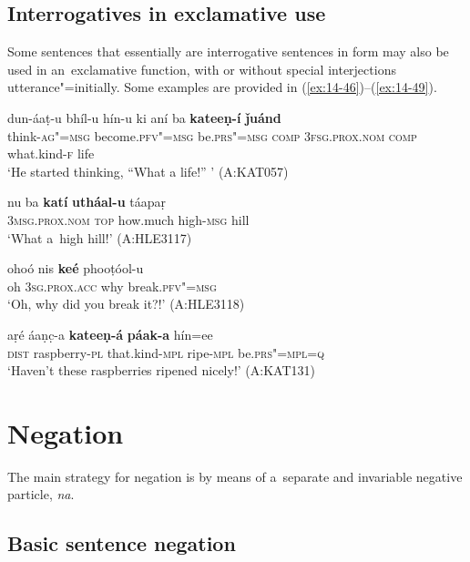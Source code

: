 \subsection{Interrogatives in exclamative use}
\label{subsec:14-2-4}

Some sentences that essentially are interrogative sentences in form may also be used in an~exclamative function, with or without special interjections utterance"=initially. Some examples are provided in (\ref{ex:14-46})--(\ref{ex:14-49}). 
\begin{exe}
\ex
\label{ex:14-46}
\gll dun-áaṭ-u bhíl-u hín-u ki  aní ba \textbf{kateeṇ-í} \textbf{ǰuánd} \\
think-\textsc{ag"=msg} become.\textsc{pfv"=msg} be.\textsc{prs"=msg} \textsc{comp}  \textsc{3fsg.prox.nom} \textsc{comp} what.kind-\textsc{f} life  \\
\glt `He started thinking, ``What a life!'' ' (A:KAT057)

\ex
\label{ex:14-47}
\gll nu ba \textbf{katí} \textbf{utháal-u} táapaṛ \\
\textsc{3msg.prox.nom} \textsc{top} how.much high-\textsc{msg} hill  \\
\glt `What a~high hill!' (A:HLE3117)

\ex
\label{ex:14-48}
\gll ohoó nis \textbf{keé} phooṭóol-u \\
oh \textsc{3sg.prox.acc} why break.\textsc{pfv"=msg} \\
\glt `Oh, why did you break it?!' (A:HLE3118)

\ex
\label{ex:14-49}
\gll aṛé áaṇc̣-a \textbf{kateeṇ-á} \textbf{páak-a} hín=ee \\
\textsc{dist} raspberry-\textsc{pl} that.kind-\textsc{mpl} ripe-\textsc{mpl} be.\textsc{prs"=mpl=q} \\
\glt `Haven't these raspberries ripened nicely!' (A:KAT131)
\end{exe}

\section{Negation}
\label{sec:14-3}


The main strategy for negation is by means of a~separate and invariable negative particle, \textit{na}. 


\subsection{Basic sentence negation}
\label{subsec:14-3-1}


